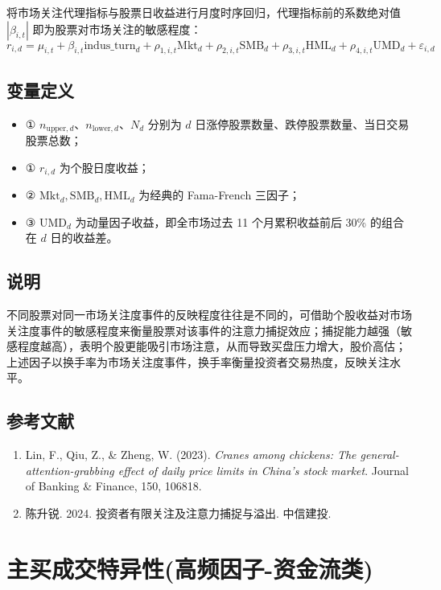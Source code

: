 \documentclass{article}
\begin{document}
将市场关注代理指标与股票日收益进行月度时序回归，代理指标前的系数绝对值 \(|\beta_{i,t}|\) 即为股票对市场关注的敏感程度：
\begin{equation}
    r_{i,d} = \mu_{i,t} + \beta_{i,t} \mathrm{indus\_turn}_d + \rho_{1,i,t} \mathrm{Mkt}_d + \rho_{2,i,t} \mathrm{SMB}_d + \rho_{3,i,t} \mathrm{HML}_d + \rho_{4,i,t} \mathrm{UMD}_d + \varepsilon_{i,d}
\end{equation}

\subsection{变量定义}
\begin{itemize}
    \item ① \(n_{\mathrm{upper},d}\)、\(n_{\mathrm{lower},d}\)、\(N_d\) 分别为 \(d\) 日涨停股票数量、跌停股票数量、当日交易股票总数；
    \item ① \( r_{i,d} \) 为个股日度收益；
    \item ② \( \mathrm{Mkt}_d, \mathrm{SMB}_d, \mathrm{HML}_d \) 为经典的 Fama-French 三因子；
    \item ③ \( \mathrm{UMD}_d \) 为动量因子收益，即全市场过去 11 个月累积收益前后 30\% 的组合在 \( d \) 日的收益差。
\end{itemize}

\subsection{说明}
不同股票对同一市场关注度事件的反映程度往往是不同的，可借助个股收益对市场关注度事件的敏感程度来衡量股票对该事件的注意力捕捉效应；捕捉能力越强（敏感程度越高），表明个股更能吸引市场注意，从而导致买盘压力增大，股价高估；上述因子以换手率为市场关注度事件，换手率衡量投资者交易热度，反映关注水平。

\subsection{参考文献}
\begin{enumerate}
    \item Lin, F., Qiu, Z., \& Zheng, W. (2023). \textit{Cranes among chickens: The general-attention-grabbing effect of daily price limits in China's stock market}. Journal of Banking \& Finance, 150, 106818.
    \item 陈升锐. 2024. 投资者有限关注及注意力捕捉与溢出. 中信建投.
\end{enumerate}

\section{主买成交特异性(高频因子-资金流类)}
\end{document}
